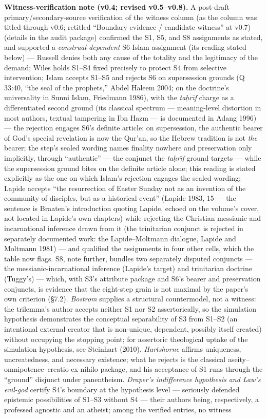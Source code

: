 \textbf{Witness-verification note (v0.4; revised v0.5--v0.8).} A post-draft primary/secondary-source verification of the witness column (as the column was titled through v0.6; retitled ``Boundary evidence / candidate witness'' at v0.7) (details in the audit package) confirmed the S1, S5, and S8 assignments as stated, and supported a \emph{construal-dependent} S6-Islam assignment (its reading stated below) --- Russell denies both any cause of the totality and the legitimacy of the demand; Wiles holds S1--S4 fixed precisely to protect S4 from selective intervention; Islam accepts S1--S5 and rejects S6 on supersession grounds (Q 33:40, ``the seal of the prophets,'' Abdel Haleem 2004; on the doctrine's universality in Sunni Islam, Friedmann 1986), with the \emph{ta\d{h}r\={\i}f} charge as a differentiated second ground (its classical spectrum --- meaning-level distortion in most authors, textual tampering in Ibn Hazm --- is documented in Adang 1996) --- the rejection engages S6's definite article: on supersession, the authentic bearer of God's special revelation is now the Qur'an, so the Hebrew tradition is not \emph{the} bearer; the step's sealed wording names finality nowhere and preservation only implicitly, through ``authentic'' --- the conjunct the \emph{ta\d{h}r\={\i}f} ground targets --- while the supersession ground bites on the definite article alone; this reading is stated explicitly as the one on which Islam's rejection engages the sealed wording; Lapide accepts ``the resurrection of Easter Sunday not as an invention of the community of disciples, but as a historical event'' (Lapide 1983, 15 --- the sentence is Braaten's introduction quoting Lapide, echoed on the volume's cover, not located in Lapide's own chapters) while rejecting the Christian messianic and incarnational inference drawn from it (the trinitarian conjunct is rejected in separately documented work: the Lapide--Moltmann dialogue, Lapide and Moltmann 1981) --- and qualified the assignments in four other cells, which the table now flags. S8, note further, bundles two separately disputed conjuncts --- the messianic-incarnational inference (Lapide's target) and trinitarian doctrine (Tuggy's) --- which, with S3's attribute package and S6's bearer and preservation conjuncts, is evidence that the eight-step grain is not maximal by the paper's own criterion (\S{}7.2). \emph{Bostrom} supplies a structural countermodel, not a witness: the trilemma's author accepts neither S1 nor S2 assertorically, so the simulation hypothesis demonstrates the conceptual separability of S3 from S1--S2 (an intentional external creator that is non-unique, dependent, possibly itself created) without occupying the stopping point; for assertoric theological uptake of the simulation hypothesis, see Steinhart (2010). \emph{Hartshorne} affirms uniqueness, uncreatedness, and necessary existence; what he rejects is the classical aseity--omnipotence--creatio-ex-nihilo package, and his acceptance of S1 runs through the ``ground'' disjunct under panentheism. \emph{Draper's indifference hypothesis and Law's evil-god} certify S4's boundary at the hypothesis level --- seriously defended epistemic possibilities of S1--S3 without S4 --- their authors being, respectively, a professed agnostic and an atheist; among the verified entries, no witness 